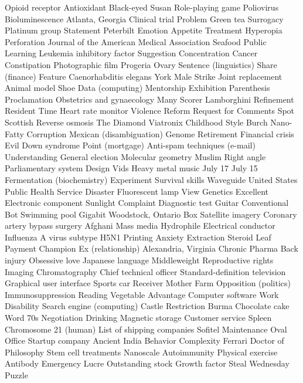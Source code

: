 Opioid receptor  Antioxidant  Black-eyed Susan  
Role-playing game  Poliovirus  Bioluminescence  
Atlanta, Georgia  Clinical trial  Problem  
Green tea  Surrogacy  Platinum group  
Statement  Peterbilt  Emotion  
Appetite  Treatment  Hyperopia  
Perforation  Journal of the American Medical Association  Seafood  
Public  Learning  Leukemia inhibitory factor  
Suggestion  Concentration  Cancer  
Constipation  Photographic film  Progeria  
Ovary  Sentence (linguistics)  Share (finance)  
Feature  Caenorhabditis elegans  York  
Male  Strike  Joint replacement  
Animal model  Shoe  Data (computing)  
Mentorship  Exhibition  Parenthesis  
Proclamation  Obstetrics and gynaecology  Many  
Scorer  Lamborghini  Refinement  
Resident  Time  Heart rate monitor  
Violence  Reform  Request for Comments  
Spot  Scottish  Reverse osmosis  
The Diamond  Viatronix  Childhood  
Style  Burch  Nano-  
Fatty  Corruption  Mexican (disambiguation)  
Genome  Retirement  Financial crisis  
Evil  Down syndrome  Point (mortgage)  
Anti-spam techniques (e-mail)  Understanding  General election  
Molecular geometry  Muslim  Right angle  
Parliamentary system  Design  Vids  
Heavy metal music  July 17  July 15  
Fermentation (biochemistry)  Experiment  Survival skills  
Waveguide  United States Public Health Service  Disaster  
Fluorescent lamp  View  Genetics  
Excellent  Electronic component  Sunlight  
Complaint  Diagnostic test  Guitar  
Conventional  Bot  Swimming pool  
Gigabit  Woodstock, Ontario  Box  
Satellite imagery  Coronary artery bypass surgery  Afghani  
Mass media  Hydrophile  Electrical conductor  
Influenza A virus subtype H5N1  Printing  Anxiety  
Extraction  Steroid  Leaf  
Payment  Champion  Ex (relationship)  
Alexandria, Virginia  Chronic  Pharma  
Back injury  Obsessive love  Japanese language  
Middleweight  Reproductive rights  Imaging  
Chromatography  Chief technical officer  Standard-definition television  
Graphical user interface  Sports car  Receiver  
Mother  Farm  Opposition (politics)  
Immunosuppression  Reading  Vegetable  
Advantage  Computer software  Work  
Disability  Search engine (computing)  Castle  
Restriction  Burma  Chocolate cake  
Word  70s  Negotiation  
Drinking  Magnetic storage  Customer service  
Spleen  Chromosome 21 (human)  List of shipping companies  
Sofitel  Maintenance  Oval Office  
Startup company  Ancient India  Behavior  
Complexity  Ferrari  Doctor of Philosophy  
Stem cell treatments  Nanoscale  Autoimmunity  
Physical exercise  Antibody  Emergency  
Lucre  Outstanding stock  Growth factor  
Steal  Wednesday  Puzzle  
